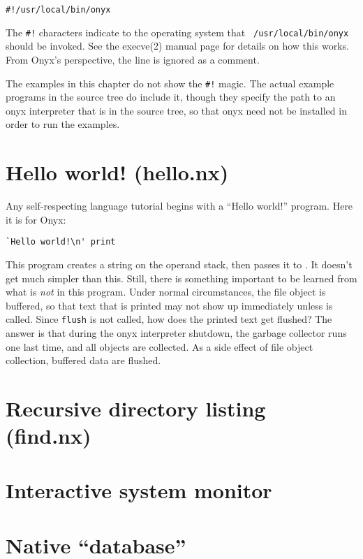 \begin{verbatim}
#!/usr/local/bin/onyx
\end{verbatim}

The {\tt \#!} characters indicate to the operating system that {\tt
/usr/local/bin/onyx} should be invoked.  See the execve(2) manual page for
details on how this works.  From Onyx's perspective, the line is ignored as a
comment.

The examples in this chapter do not show the {\tt \#!} magic.  The actual
example programs in the source tree do include it, though they specify the path
to an onyx interpreter that is in the source tree, so that onyx need not be
installed in order to run the examples.

\section{Hello world! (hello.nx)}

Any self-respecting language tutorial begins with a ``Hello world!'' program.
Here it is for Onyx:

\begin{verbatim}
`Hello world!\n' print
\end{verbatim}

This program creates a string on the operand stack, then passes it to
.  It doesn't get much simpler than this.
Still, there is something important to be learned from what is {\em not} in this
program.  Under normal circumstances, the  file object is buffered, so that text that is
printed may not show up immediately unless  is called.  Since {\tt flush} is not called, how does
the printed text get flushed?  The answer is that during the onyx interpreter
shutdown, the garbage collector runs one last time, and all objects are
collected.  As a side effect of file object collection, buffered data are
flushed.

\section{Recursive directory listing (find.nx)}

\section{Interactive system monitor}

\section{Native ``database''}
